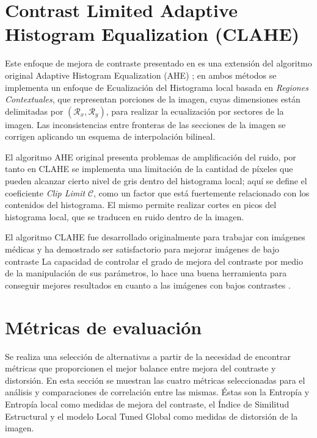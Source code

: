 \documentclass[spanish,twocolumn]{article}
\begin{document}

\section{Contrast Limited Adaptive Histogram Equalization (CLAHE)}
\label{sec:clahe}
Este enfoque de mejora de contraste presentado en \cite{zuiderveld1994contrast} es una extensión del algoritmo original Adaptive Histogram Equalization (AHE) \cite{pizer1987adaptive}; en ambos métodos se implementa un enfoque de Ecualización del Histograma local basada en \textbf{\emph{\textbf{}}}{\it Regiones Contextuales}, que representan porciones de la imagen, cuyas dimensiones están delimitadas por $(\mathcal{R}_x, \mathcal{R}_y)$, para realizar la ecualización por sectores de la imagen. Las inconsistencias entre fronteras de las secciones de la imagen se corrigen aplicando un esquema de interpolación bilineal. 

El algoritmo AHE original presenta problemas de amplificación del ruido, por tanto en CLAHE se implementa una limitación de la cantidad de píxeles que pueden alcanzar cierto nivel de gris dentro del histograma local; aquí se define el coeficiente {\it Clip Limit} $\mathcal{C}$, como un factor que está fuertemente relacionado con los contenidos del histograma. El mismo permite realizar cortes en picos del histograma local, que se traducen en ruido dentro de la imagen.

El algoritmo CLAHE fue desarrollado originalmente para trabajar con imágenes médicas y ha demostrado ser satisfactorio para mejorar imágenes de bajo contraste \cite{SMG11,MR13}
La capacidad de controlar el grado de mejora del contraste por medio de la manipulación de sus parámetros, lo hace una buena herramienta para conseguir mejores resultados en cuanto a las imágenes con bajos contrastes \cite{morebrizuela2014}. 


\section{Métricas de evaluación}
\label{sec:metricas}
Se realiza una selección de alternativas a partir de la necesidad de encontrar métricas que proporcionen el mejor balance entre mejora del contraste y distorsión. En esta sección se muestran las cuatro métricas seleccionadas para el análisis y comparaciones de correlación entre las mismas. Éstas son la Entropía y Entropía local como medidas de mejora del contraste, el Índice de Similitud Estructural y el modelo Local Tuned Global como medidas de distorsión de la imagen.
\end{document}
